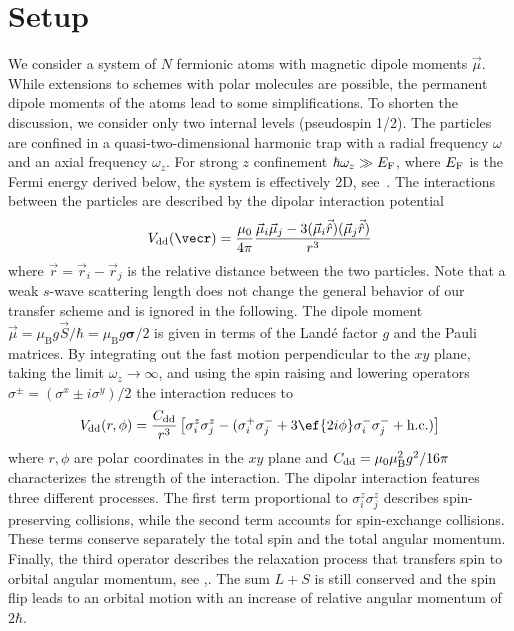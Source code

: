 \section{Setup}

We consider a system of $N$ fermionic atoms with magnetic dipole moments $\vec{\mu}$. While extensions to schemes with polar molecules are possible, the permanent dipole moments of the atoms lead to some simplifications.
To shorten the discussion, we consider only two internal levels (pseudospin 1/2). The particles are confined in a quasi-two-dimensional harmonic trap with a radial frequency $\omega$ and an axial frequency $\omega_z$. For strong $z$ confinement $\hbar\omega_z \gg E_\text{F}$, where $E_\text{F}$ is the Fermi energy derived below, the system is effectively 2D, see~.
The interactions between the particles are described by the dipolar interaction potential
\begin{align*}
\Vdd(\vecr) = \frac{\mu_0}{4\pi}\frac{\vec{\mu}_i  \vec{\mu}_j - 3(\vec{\mu}_i  \vec{\hat{r}})(\vec{\mu}_j \vec{\hat{r}})}{r^3}
\end{align*}
where $\vec{r}=\vec{r}_i-\vec{r}_j$ is the relative distance between the two particles.
Note that a weak $s$-wave scattering length does not change the general behavior of our transfer scheme and is ignored in the following.
The dipole moment $\vec{\mu} =  \mu_\text{B}g \vec{S} / \hbar = \mu_\text{B}g {\boldsymbol\sigma}/2$ is given in terms of the Land\'e factor $g$ and the Pauli matrices. By integrating out the fast motion perpendicular to the $xy$ plane, taking the limit $\omega_z\rightarrow\infty$, and using the spin raising and lowering operators $\sigma^{\pm} = (\sigma^x \pm i \sigma^y)/2$ the interaction reduces to
\begin{align*}
\Vdd(r,\phi) =  \frac{\Cdd}{r^3} \left[
\sigma^z_i \sigma^z_j - (\sigma^+_i \sigma^-_j +3 \ef{2i\phi} \sigma^-_i \sigma^-_j  +\text{h.c.})
\right]
\end{align*}
where $r,\phi$ are polar coordinates in the $xy$ plane and $C_\text{dd} = \mu_0 \mu_\text{B}^2 g^2 / 16\pi$  characterizes the strength of the interaction. The dipolar interaction features three different processes. The first term proportional to $\sigma^z_i\sigma^z_j$ describes spin-preserving collisions, while the second term  accounts for spin-exchange collisions. These terms conserve separately the total spin and the total angular momentum.  Finally, the third operator  describes the relaxation process that transfers spin to orbital angular momentum, see ,. The sum $L+S$ is still conserved and the spin flip leads to an orbital motion with an increase of relative angular momentum of $2\hbar$.


